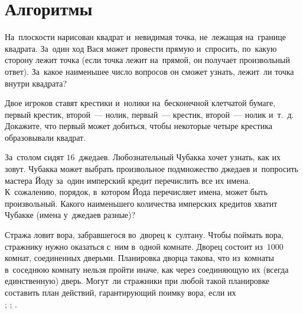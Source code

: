 
\section*{Алгоритмы}



\begin{problems}


\item
На~плоскости нарисован квадрат и~невидимая точка, не~лежащая на~границе
квадрата.
За~один ход Вася может провести прямую и~спросить, по~какую сторону лежит точка
(если точка лежит на~прямой, он получает произвольный ответ).
За~какое наименьшее число вопросов он сможет узнать, лежит~ли точка внутри
квадрата?

\item
Двое игроков ставят крестики и~нолики на~бесконечной клетчатой бумаге, первый
крестик, второй~--- нолик, первый~--- крестик, второй~--- нолик и~т.~д.
Докажите, что первый может добиться, чтобы некоторые четыре крестика
образовывали квадрат.

\item
За~столом сидят $16$~джедаев.
Любознательный Чубакка хочет узнать, как их зовут.
Чубакка может выбрать произвольное подмножество джедаев и~попросить
мастера Йоду за~один имперский кредит перечислить все их имена.
К~сожалению, порядок, в~котором Йода перечисляет имена, может быть
произвольный.
Какого наименьшего количества имперских кредитов хватит Чубакке
(имена у~джедаев разные)?

\item
Стража ловит вора, забравшегося во~дворец к~султану.
Чтобы поймать вора, стражнику нужно оказаться с~ним в~одной комнате.
Дворец состоит из~$1000$ комнат, соединенных дверьми.
Планировка дворца такова, что из~комнаты в~соседнюю комнату нельзя пройти
иначе, как через соединяющую их (всегда единственную) дверь.
Могут~ли стражники при любой такой планировке составить план действий,
гарантирующий поимку вора, если их
\\
;
\qquad
{};
\qquad
{}.


\end{problems}
